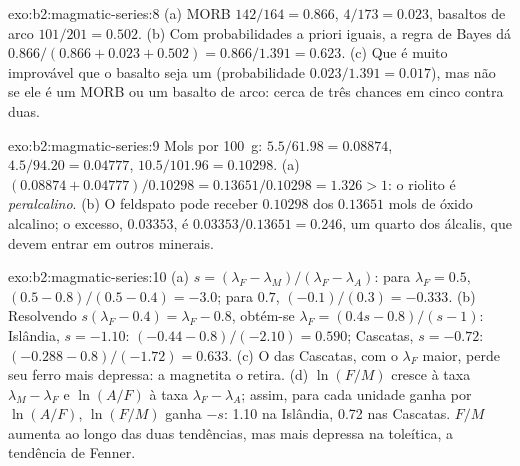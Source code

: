 \begin{solution}{exo:b2:magmatic-series:8}
(a) MORB $142/164 = 0.866$,  $4/173 = 0.023$, basaltos de arco $101/201 =
0.502$. (b) Com probabilidades a priori iguais, a regra de Bayes dá $0.866/(0.866 + 0.023 + 0.502) =
0.866/1.391 = 0.623$. (c) Que é muito improvável que o basalto seja um 
(probabilidade $0.023/1.391 = 0.017$), mas não se ele é um MORB ou um basalto de arco:
cerca de três chances em cinco contra duas.
\end{solution}

\begin{solution}{exo:b2:magmatic-series:9}
Mols por \qty{100}{g}:  $5.5/61.98 = 0.08874$,  $4.5/94.20 =
0.04777$,  $10.5/101.96 = 0.10298$. (a) $(0.08874 + 0.04777)/0.10298 =
0.13651/0.10298 = 1.326 > 1$: o riolito é \emph{peralcalino}. (b) O feldspato pode
receber $0.10298$ dos $0.13651$ mols de óxido alcalino; o excesso, $0.03353$, é
$0.03353/0.13651 = 0.246$, um quarto dos álcalis, que devem entrar em outros minerais.
\end{solution}

\begin{solution}{exo:b2:magmatic-series:10}
(a) $s = (\lambda_F - \lambda_M)/(\lambda_F - \lambda_A)$: para $\lambda_F = 0.5$, $(0.5
- 0.8)/(0.5 - 0.4) = -3.0$; para $0.7$, $(-0.1)/(0.3) = -0.333$. (b) Resolvendo
$s(\lambda_F - 0.4) = \lambda_F - 0.8$, obtém-se $\lambda_F = (0.4s - 0.8)/(s - 1)$:
Islândia, $s = -1.10$: $(-0.44 - 0.8)/(-2.10) = 0.590$; Cascatas, $s = -0.72$:
$(-0.288 - 0.8)/(-1.72) = 0.633$. (c) O  das Cascatas, com o $\lambda_F$
maior, perde seu ferro mais depressa: a magnetita o retira. (d) $\ln(F/M)$ cresce à
taxa $\lambda_M - \lambda_F$ e $\ln(A/F)$ à taxa $\lambda_F - \lambda_A$; assim, para
cada unidade ganha por $\ln(A/F)$, $\ln(F/M)$ ganha $-s$: 1.10 na Islândia, 0.72 nas
Cascatas. $F/M$ aumenta ao longo das duas tendências, mas mais depressa na toleítica, a tendência de
Fenner.
\end{solution}

